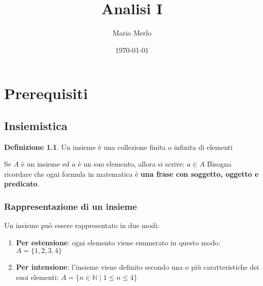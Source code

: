 \documentclass[a4paper, 12pt]{book}
\title{Analisi I}
\author{Mario Merlo}
\date{\today}
\theoremstyle{definition}
\newtheorem{definition}{Definizione}[chapter]
\theoremstyle{remark}
\theoremstyle{plain}
\newcommand{\N}{\mathbb{N}}
\begin{document}
\maketitle

\doclicenseThis

\chapter{Prerequisiti}

\section{Insiemistica}

\begin{definition}
    Un insieme è una collezione finita o infinita di elementi
\end{definition}

Se $A$ è un insieme ed $a$ è un suo elemento, allora si scrive: $a \in A$
Bisogna ricordare che ogni formula in matematica è \textbf{una frase con soggetto, oggetto e predicato}.

\subsection{Rappresentazione di un insieme}

Un insieme può essere rappresentato in due modi:
\begin{enumerate}
    \item \textbf{Per estensione}: ogni elemento viene enumerato in questo modo: $A = \{1, 2, 3, 4\}$
    \item \textbf{Per intensione}: l'insieme viene definito secondo una o più caratteristiche dei suoi elementi: $A = \{n \in \N \mid 1 \leq n \leq 4\}$
\end{enumerate}
\end{document}
